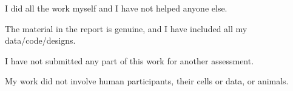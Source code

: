 \begin{StatementofOriginality}
\vskip10pt

\begin{tcolorbox}
I did all the work myself and I have not helped anyone else.
\end{tcolorbox}

\vskip10pt

\begin{tcolorbox}
The material in the report is genuine, and I have included all my data/code/designs.
\end{tcolorbox}

\vskip10pt


\begin{tcolorbox}
I have not submitted any part of this work for another assessment.
\end{tcolorbox}

\vskip10pt

\begin{tcolorbox}
My work did not involve human participants, their cells or data, or animals.
\end{tcolorbox}

\end{StatementofOriginality}